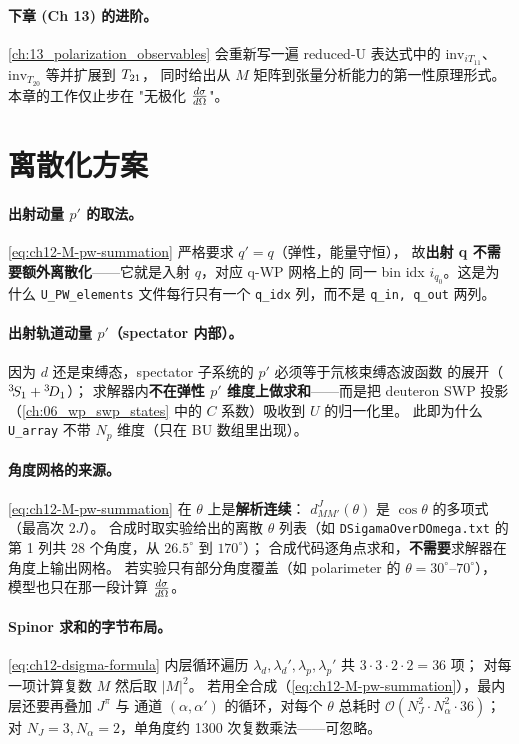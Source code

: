 \paragraph{下章 (Ch 13) 的进阶。}
\cref{ch:13_polarization_observables} 会重新写一遍 reduced-U 表达式中的
\(\mathrm{inv}_{iT_{11}}\)、\(\mathrm{inv}_{T_{20}}\) 等并扩展到 \({T_{21}}\)，
同时给出从 \(M\) 矩阵到张量分析能力的第一性原理形式。本章的工作仅止步在
"无极化 \(\frac{d\sigma}{d\Omega}\)"。

\section{离散化方案}
\label{sec:ch12-discretization}

\paragraph{出射动量 \(p'\) 的取法。}
\cref{eq:ch12-M-pw-summation} 严格要求 \(q' = q\)（弹性，能量守恒），
故\textbf{出射 q 不需要额外离散化}——它就是入射 \(q\)，对应 q-WP 网格上的
同一 bin idx \(i_{q_0}\)。这是为什么 \texttt{U\_PW\_elements} 文件每行只有一个
\texttt{q\_idx} 列，而不是 \texttt{q\_in, q\_out} 两列。

\paragraph{出射轨道动量 \(p'\)（spectator 内部）。}
因为 \(d\) 还是束缚态，spectator 子系统的 \(p'\) 必须等于氘核束缚态波函数
的展开（\({}^{3}\!S_{1}+{}^{3}\!D_{1}\)）；
求解器内\textbf{不在弹性 \(p'\) 维度上做求和}——而是把 deuteron SWP 投影
（\cref{ch:06_wp_swp_states} 中的 \(C\) 系数）吸收到 \(U\) 的归一化里。
此即为什么 \texttt{U\_array} 不带 \(N_p\) 维度（只在 BU 数组里出现）。

\paragraph{角度网格的来源。}
\cref{eq:ch12-M-pw-summation} 在 \(\theta\) 上是\textbf{解析连续}：
\(d^J_{M M'}(\theta)\) 是 \(\cos\theta\) 的多项式（最高次 \(2J\)）。
合成时取实验给出的离散 \(\theta\) 列表（如
\texttt{DSigamaOverDOmega.txt} 的第 1 列共 28 个角度，从 \(26.5^\circ\) 到 \(170^\circ\)）；
合成代码逐角点求和，\textbf{不需要}求解器在角度上输出网格。
若实验只有部分角度覆盖（如 polarimeter 的 \(\theta = 30^\circ\)--\(70^\circ\)），
模型也只在那一段计算 \(\frac{d\sigma}{d\Omega}\)。

\paragraph{Spinor 求和的字节布局。}
\cref{eq:ch12-dsigma-formula} 内层循环遍历
\(\lambda_d, \lambda_d', \lambda_p, \lambda_p'\) 共 \(3\cdot 3\cdot 2\cdot 2 = 36\) 项；
对每一项计算复数 \(M\) 然后取 \(|M|^2\)。
若用全合成（\cref{eq:ch12-M-pw-summation}），最内层还要再叠加 \(J^\pi\) 与
通道 \((\alpha, \alpha')\) 的循环，对每个 \(\theta\) 总耗时
\(\mathcal{O}(N_J^2 \cdot N_\alpha^2 \cdot 36)\)；
对 \(N_J = 3, N_\alpha = 2\)，单角度约 1300 次复数乘法——可忽略。

